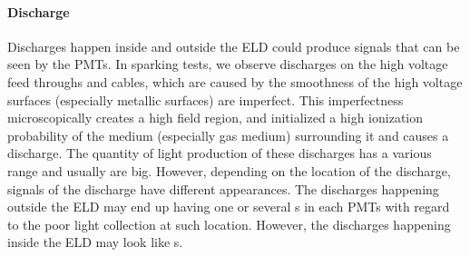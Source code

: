 \paragraph{Discharge}
\label{sec:microdischarge} 
Discharges happen inside and outside the ELD could produce signals that can be seen by the PMTs.  In sparking tests, we observe discharges on the high voltage feed throughs and cables, which are caused by the smoothness of the high voltage surfaces (especially metallic surfaces) are imperfect. This imperfectness microscopically creates a high field region, and initialized a high ionization probability of the medium (especially gas medium) surrounding it and causes a discharge. The quantity of light production of these discharges has a various range and usually are big. However, depending on the location of the discharge, signals of the discharge have different appearances. The discharges happening outside the ELD may end up having one or several \sphe s in each PMTs with regard to the poor light collection at such location. However, the discharges happening inside the ELD may look like \ees s. 



